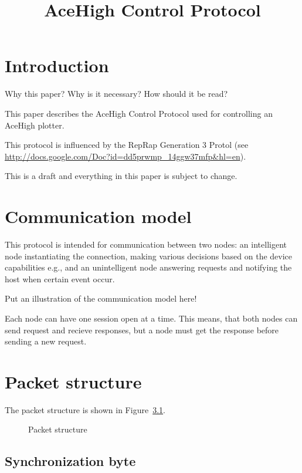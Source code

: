 \documentclass[11pt,a4paper,oneside,article]{memoir}
\title{AceHigh Control Protocol}
\begin{document}
\maketitle

\tableofcontents*

\chapter{Introduction}

Why this paper? Why is it necessary? How should it be read?

This paper describes the AceHigh Control Protocol used for controlling
an AceHigh plotter.

This protocol is influenced by the RepRap Generation 3 Protol (see
\url{http://docs.google.com/Doc?id=dd5prwmp_14ggw37mfp&hl=en}).

This is a draft and everything in this paper is subject to change.


\chapter{Communication model}

This protocol is intended for communication between two nodes: an
intelligent node instantiating the connection, making various
decisions based on the device capabilities e.g., and an unintelligent
node answering requests and notifying the host when certain event
occur.

Put an illustration of the communication model here!

Each node can have one session open at a time. This means, that both
nodes can send request and recieve responses, but a node must get the
response before sending a new request.


\chapter{Packet structure}

The packet structure is shown in Figure~\ref{fig:packet-structure}.

\begin{figure}[htbp]
  \centering
  \vspace{2cm}
  \caption{Packet structure}
  \label{fig:packet-structure}
\end{figure}


\section{Synchronization byte}
\end{document}
